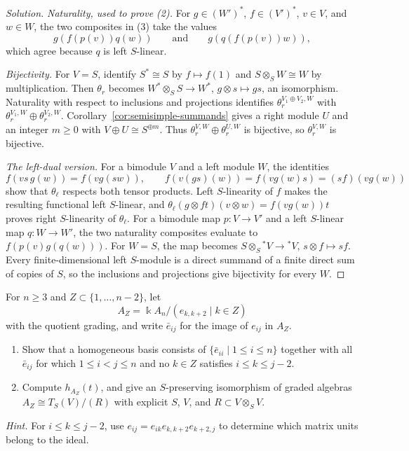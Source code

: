 \begin{advanced}
\begin{hidden}
\begin{proof}[Solution]
\emph{Naturality, used to prove (2).}
For $g\in(W')^*$, $f\in(V')^*$, $v\in V$, and $w\in W$, the two composites in (3) take the values
\[
g(f(p(v))q(w))\qquad\text{and}\qquad g(q(f(p(v))w)),
\]
which agree because $q$ is left $S$-linear.

\emph{Bijectivity.}
For $V=S$, identify $S^*\cong S$ by $f\mapsto f(1)$ and $S\otimes_S W\cong W$ by multiplication.
Then $\theta_r$ becomes $W^*\otimes_S S\to W^*$, $g\otimes s\mapsto gs$, an isomorphism.
Naturality with respect to inclusions and projections identifies $\theta_r^{V_1\oplus V_2,W}$ with $\theta_r^{V_1,W}\oplus\theta_r^{V_2,W}$.
Corollary~\ref{cor:semisimple-summands} gives a right module $U$ and an integer $m\geq0$ with $V\oplus U\cong S^{\oplus m}$.
Thus $\theta_r^{V,W}\oplus\theta_r^{U,W}$ is bijective, so $\theta_r^{V,W}$ is bijective.

\emph{The left-dual version.}
For a bimodule $V$ and a left module $W$, the identities
\[
f(vs\,g(w))=f(vg(sw)),\qquad
f(v(gs)(w))=f(vg(w)s)=(sf)(vg(w))
\]
show that $\theta_\ell$ respects both tensor products.
Left $S$-linearity of $f$ makes the resulting functional left $S$-linear, and
$\theta_\ell(g\otimes ft)(v\otimes w)=f(vg(w))t$ proves right $S$-linearity of $\theta_\ell$.
For a bimodule map $p:V\to V'$ and a left $S$-linear map $q:W\to W'$, the two naturality composites evaluate to $f(p(v)g(q(w)))$.
For $W=S$, the map becomes $S\otimes_S{}^*V\to{}^*V$, $s\otimes f\mapsto sf$.
Every finite-dimensional left $S$-module is a direct summand of a finite direct sum of copies of $S$, so the inclusions and projections give bijectivity for every $W$.
\end{proof}

\end{hidden}
\end{advanced}

\begin{exercise}
For $n\geq3$ and $Z\subset\{1,\ldots,n-2\}$, let
\[
A_Z=\Bbbk A_n/(e_{k,k+2}\mid k\in Z)
\]
with the quotient grading, and write $\bar e_{ij}$ for the image of $e_{ij}$ in $A_Z$.
\begin{enumerate}
\item Show that a homogeneous basis consists of $\{\bar e_{ii}\mid 1\leq i\leq n\}$ together with all $\bar e_{ij}$ for which $1\leq i<j\leq n$ and no $k\in Z$ satisfies $i\leq k\leq j-2$.
\item Compute $h_{A_Z}(t)$, and give an $S$-preserving isomorphism of graded algebras $A_Z\cong T_S(V)/(R)$ with explicit $S$, $V$, and $R\subset V\otimes_S V$.
\end{enumerate}
\emph{Hint.} For $i\leq k\leq j-2$, use $e_{ij}=e_{ik}e_{k,k+2}e_{k+2,j}$ to determine which matrix units belong to the ideal.
\end{exercise}

